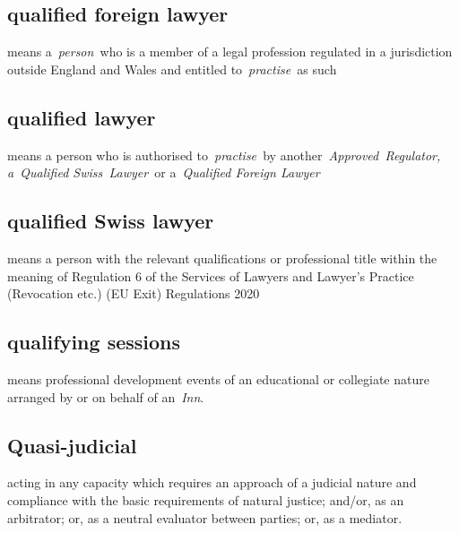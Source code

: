  \subsection{qualified foreign lawyer } means a~\emph{person~}who is a
  member of a legal profession regulated in a jurisdiction outside
  England and Wales and entitled to~\emph{practise~}as such
  \subsection{qualified lawyer } means a person who is authorised
  to~\emph{practise~}by another~\emph{Approved~Regulator, a~Qualified
  Swiss~Lawyer~}or a~\emph{Qualified Foreign Lawyer} \subsection{qualified Swiss lawyer } means a person with the relevant
  qualifications or professional title within the meaning of Regulation
  6 of the Services of Lawyers and Lawyer's Practice (Revocation etc.)
  (EU Exit) Regulations 2020  \subsection{qualifying sessions } means professional development events
  of an educational or collegiate nature arranged by or on behalf of
  an~\emph{Inn}.  \subsection{Quasi-judicial }acting in any capacity which requires an
  approach of a judicial nature and compliance with the basic
  requirements of natural justice; and/or, as an arbitrator; or, as a
  neutral evaluator between parties; or, as a mediator.
